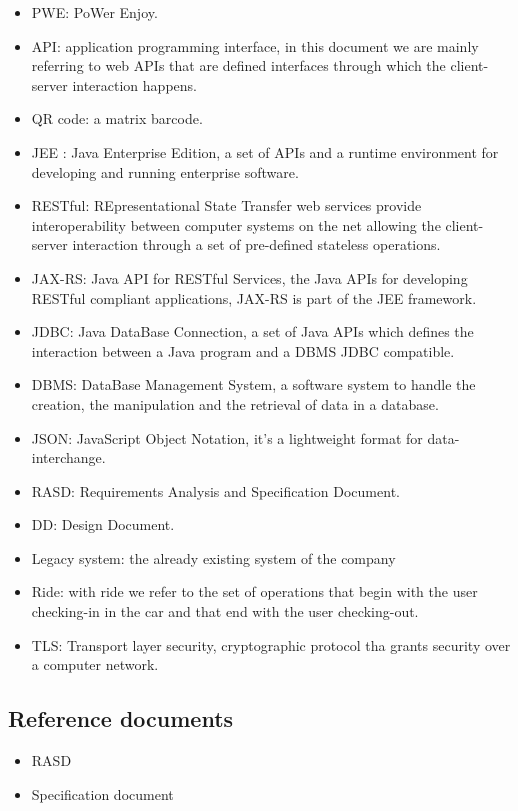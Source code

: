 \documentclass[]{article}
\providecommand{\tightlist}{%
  \setlength{\itemsep}{0pt}\setlength{\parskip}{0pt}}
\begin{document}
\begin{itemize}
\tightlist
\item
  PWE: PoWer Enjoy.
\item
  API: application programming interface, in this document we are mainly
  referring to web APIs that are defined interfaces through which the
  client-server interaction happens.
\item
  QR code: a matrix barcode.
\item
  JEE : Java Enterprise Edition, a set of APIs and a runtime environment
  for developing and running enterprise software.
\item
  RESTful: REpresentational State Transfer web services provide
  interoperability between computer systems on the net allowing the
  client-server interaction through a set of pre-defined stateless
  operations.
\item
  JAX-RS: Java API for RESTful Services, the Java APIs for developing
  RESTful compliant applications, JAX-RS is part of the JEE framework.
\item
  JDBC: Java DataBase Connection, a set of Java APIs which defines the
  interaction between a Java program and a DBMS JDBC compatible.
\item
  DBMS: DataBase Management System, a software system to handle the
  creation, the manipulation and the retrieval of data in a database.
\item
  JSON: JavaScript Object Notation, it's a lightweight format for
  data-interchange.
\item
  RASD: Requirements Analysis and Specification Document.
\item
  DD: Design Document.
\item
  Legacy system: the already existing system of the company
\item
  Ride: with ride we refer to the set of operations that begin with the
  user checking-in in the car and that end with the user checking-out.
\item
  TLS: Transport layer security, cryptographic protocol tha grants
  security over a computer network.
\end{itemize}

\subsection{Reference documents}\label{reference-documents}

\begin{itemize}
\tightlist
\item
  RASD
\item
  Specification document \newpage
\end{itemize}
\end{document}
